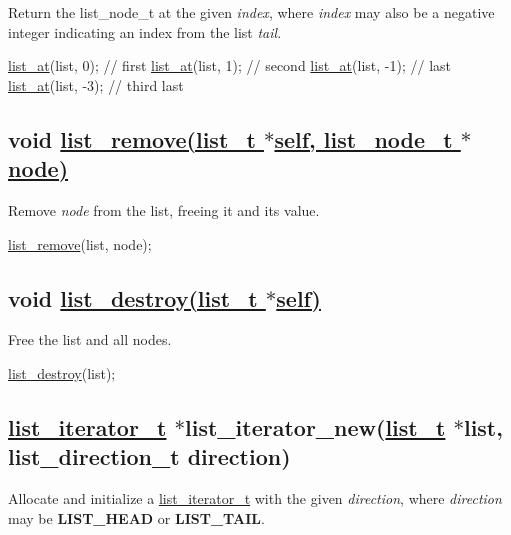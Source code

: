 Return the {\ttfamily list\+\_\+node\+\_\+t} at the given {\itshape index}, where {\itshape index} may also be a negative integer indicating an index from the list {\itshape tail}.


\begin{DoxyCode}
\hyperlink{list_8c_ab3dacc64ceb63b0a0849312b0a14c91c}{list\_at}(list, 0);  \textcolor{comment}{// first}
\hyperlink{list_8c_ab3dacc64ceb63b0a0849312b0a14c91c}{list\_at}(list, 1);  \textcolor{comment}{// second}
\hyperlink{list_8c_ab3dacc64ceb63b0a0849312b0a14c91c}{list\_at}(list, -1); \textcolor{comment}{// last}
\hyperlink{list_8c_ab3dacc64ceb63b0a0849312b0a14c91c}{list\_at}(list, -3); \textcolor{comment}{// third last}
\end{DoxyCode}


\subsection*{void \hyperlink{list_8h_a5ef7843a8a481124bce3e93541ba379a}{list\+\_\+remove(list\+\_\+t $\ast$self, list\+\_\+node\+\_\+t $\ast$node)}}

Remove {\itshape node} from the list, freeing it and it\textquotesingle{}s value.


\begin{DoxyCode}
\hyperlink{list_8c_a5ef7843a8a481124bce3e93541ba379a}{list\_remove}(list, node);
\end{DoxyCode}


\subsection*{void \hyperlink{list_8h_ac2d2be572a896cccd0e76d56eeefcbdb}{list\+\_\+destroy(list\+\_\+t $\ast$self)}}

Free the list and all nodes.


\begin{DoxyCode}
\hyperlink{list_8c_ac2d2be572a896cccd0e76d56eeefcbdb}{list\_destroy}(list);
\end{DoxyCode}


\subsection*{\hyperlink{structlist__iterator__t}{list\+\_\+iterator\+\_\+t} $\ast$list\+\_\+iterator\+\_\+new(\hyperlink{structlist__t}{list\+\_\+t} $\ast$list, list\+\_\+direction\+\_\+t direction)}

Allocate and initialize a {\ttfamily \hyperlink{structlist__iterator__t}{list\+\_\+iterator\+\_\+t}} with the given {\itshape direction}, where {\itshape direction} may be {\bfseries L\+I\+S\+T\+\_\+\+H\+E\+AD} or {\bfseries L\+I\+S\+T\+\_\+\+T\+A\+IL}.


